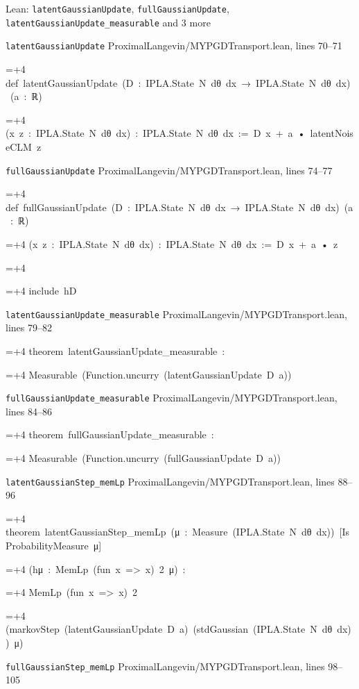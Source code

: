 \documentclass[11pt,a4paper]{report}
\newlength{\leancharwidth}
\newenvironment{leancode}{\par\smallskip\begingroup\ttfamily\footnotesize\raggedright
  \settowidth{\leancharwidth}{M}\setlength{\parskip}{0pt}\setlength{\parindent}{0pt}
  \frenchspacing}{\par\endgroup\smallskip}
\newcommand{\leanline}[2]{\hangindent=\dimexpr#1\leancharwidth+4\leancharwidth\relax
  \hangafter=1\noindent\hspace*{#1\leancharwidth}#2\par}
\newcommand{\leansource}[1]{\par{\footnotesize\color{leanmuted}#1}\par}
\begin{document}
\begin{leanbox}{Lean: \texttt{latentGaussianUpdate}, \texttt{fullGaussianUpdate}, \texttt{latentGaussianUpdate\_\allowbreak{}measurable} and 3 more}
\leansource{\texttt{latentGaussianUpdate} \quad ProximalLangevin/\allowbreak{}MYPGDTransport.lean, lines 70–71}
\begin{leancode}
\leanline{0}{def\ latentGaussianUpdate\ (D\ :\ IPLA.State\ N\ dθ\ dx\ →\ IPLA.State\ N\ dθ\ dx)\ (a\ :\ ℝ)}
\leanline{4}{(x\ z\ :\ IPLA.State\ N\ dθ\ dx)\ :\ IPLA.State\ N\ dθ\ dx\ :=\ D\ x\ +\ a\ •\ latentNoiseCLM\ z}
\end{leancode}
\leansource{\texttt{fullGaussianUpdate} \quad ProximalLangevin/\allowbreak{}MYPGDTransport.lean, lines 74–77}
\begin{leancode}
\leanline{0}{def\ fullGaussianUpdate\ (D\ :\ IPLA.State\ N\ dθ\ dx\ →\ IPLA.State\ N\ dθ\ dx)\ (a\ :\ ℝ)}
\leanline{4}{(x\ z\ :\ IPLA.State\ N\ dθ\ dx)\ :\ IPLA.State\ N\ dθ\ dx\ :=\ D\ x\ +\ a\ •\ z}
\leanline{0}{\strut}
\leanline{0}{include\ hD}
\end{leancode}
\leansource{\texttt{latentGaussianUpdate\_\allowbreak{}measurable} \quad ProximalLangevin/\allowbreak{}MYPGDTransport.lean, lines 79–82}
\begin{leancode}
\leanline{0}{theorem\ latentGaussianUpdate\_measurable\ :}
\leanline{4}{Measurable\ (Function.uncurry\ (latentGaussianUpdate\ D\ a))}
\end{leancode}
\leansource{\texttt{fullGaussianUpdate\_\allowbreak{}measurable} \quad ProximalLangevin/\allowbreak{}MYPGDTransport.lean, lines 84–86}
\begin{leancode}
\leanline{0}{theorem\ fullGaussianUpdate\_measurable\ :}
\leanline{4}{Measurable\ (Function.uncurry\ (fullGaussianUpdate\ D\ a))}
\end{leancode}
\leansource{\texttt{latentGaussianStep\_\allowbreak{}memLp} \quad ProximalLangevin/\allowbreak{}MYPGDTransport.lean, lines 88–96}
\begin{leancode}
\leanline{0}{theorem\ latentGaussianStep\_memLp\ (μ\ :\ Measure\ (IPLA.State\ N\ dθ\ dx))\ [IsProbabilityMeasure\ μ]}
\leanline{4}{(hμ\ :\ MemLp\ (fun\ x\ =>\ x)\ 2\ μ)\ :}
\leanline{4}{MemLp\ (fun\ x\ =>\ x)\ 2}
\leanline{6}{(markovStep\ (latentGaussianUpdate\ D\ a)\ (stdGaussian\ (IPLA.State\ N\ dθ\ dx))\ μ)}
\end{leancode}
\leansource{\texttt{fullGaussianStep\_\allowbreak{}memLp} \quad ProximalLangevin/\allowbreak{}MYPGDTransport.lean, lines 98–105}
\begin{leancode}

\end{leancode}
\end{leanbox}
\end{document}
